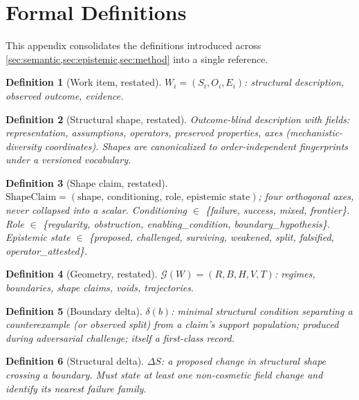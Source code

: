 \documentclass[11pt]{article}
\theoremstyle{gowthm}
\newtheorem{definition}{Definition}[section]
\theoremstyle{gowplain}
\begin{document}
\section{Formal Definitions}
\label{app:formal}

This appendix consolidates the definitions introduced across
\cref{sec:semantic,sec:epistemic,sec:method} into a single reference.

\begin{definition}[Work item, restated]
$W_i = (S_i, O_i, E_i)$: structural description, observed outcome, evidence.
\end{definition}

\begin{definition}[Structural shape, restated]
Outcome-blind description with fields:
\emph{representation}, \emph{assumptions}, \emph{operators},
\emph{preserved properties}, \emph{axes} (mechanistic-diversity coordinates).
Shapes are canonicalized to order-independent fingerprints under a versioned
vocabulary.
\end{definition}

\begin{definition}[Shape claim, restated]
$\text{ShapeClaim} = (\text{shape},\, \text{conditioning},\, \text{role},\,
\text{epistemic state})$; four orthogonal axes, never collapsed into a scalar.
Conditioning $\in$ \{failure, success, mixed, frontier\}. Role $\in$ \{regularity,
obstruction, enabling\_condition, boundary\_hypothesis\}. Epistemic state $\in$
\{proposed, challenged, surviving, weakened, split, falsified, operator\_attested\}.
\end{definition}

\begin{definition}[Geometry, restated]
$\mathcal{G}(W) = (R, B, H, V, T)$: regimes, boundaries, shape claims, voids,
trajectories.
\end{definition}

\begin{definition}[Boundary delta]
$\delta(b)$: minimal structural condition separating a counterexample (or
observed split) from a claim's support population; produced during adversarial
challenge; itself a first-class record.
\end{definition}

\begin{definition}[Structural delta]
$\Delta S$: a proposed change in structural shape crossing a boundary. Must
state at least one non-cosmetic field change and identify its nearest failure
family.
\end{definition}
\end{document}
